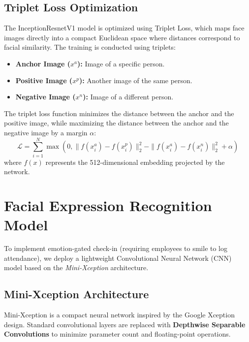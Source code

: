 \subsection{Triplet Loss Optimization}
The InceptionResnetV1 model is optimized using Triplet Loss, which maps face images directly into a compact Euclidean space where distances correspond to facial similarity. The training is conducted using triplets:
\begin{itemize}
    \item \textbf{Anchor Image ($x^a$):} Image of a specific person.
    \item \textbf{Positive Image ($x^p$):} Another image of the same person.
    \item \textbf{Negative Image ($x^n$):} Image of a different person.
\end{itemize}
The triplet loss function minimizes the distance between the anchor and the positive image, while maximizing the distance between the anchor and the negative image by a margin $\alpha$:
\begin{equation}
    \mathcal{L} = \sum_{i=1}^N \max\left(0, \|f(x_i^a) - f(x_i^p)\|_2^2 - \|f(x_i^a) - f(x_i^n)\|_2^2 + \alpha\right)
\end{equation}
where $f(x)$ represents the 512-dimensional embedding projected by the network.

\section{Facial Expression Recognition Model}
To implement emotion-gated check-in (requiring employees to smile to log attendance), we deploy a lightweight Convolutional Neural Network (CNN) model based on the \textit{Mini-Xception} architecture.

\subsection{Mini-Xception Architecture}
Mini-Xception is a compact neural network inspired by the Google Xception design. Standard convolutional layers are replaced with \textbf{Depthwise Separable Convolutions} to minimize parameter count and floating-point operations.

